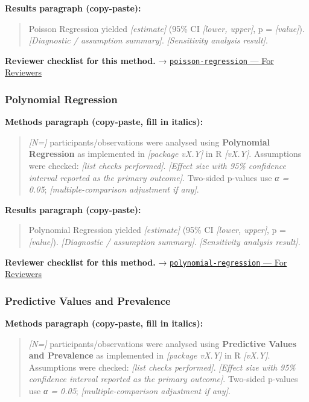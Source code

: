\documentclass[
]{article}
\begin{document}
\textbf{Results paragraph (copy-paste):}

\begin{quote}
Poisson Regression yielded \emph{{[}estimate{]}} (95\% CI
\emph{{[}lower, upper{]}}, p = \emph{{[}value{]}}). \emph{{[}Diagnostic
/ assumption summary{]}}. \emph{{[}Sensitivity analysis result{]}}.
\end{quote}

\textbf{Reviewer checklist for this method.} →
\href{../chapters/07-regression/poisson-regression.Rmd\#for-reviewers}{\texttt{poisson-regression}
--- For Reviewers}

\subsubsection{Polynomial Regression}\label{polynomial-regression}

\textbf{Methods paragraph (copy-paste, fill in italics):}

\begin{quote}
\emph{{[}N={]}} participants/observations were analysed using
\textbf{Polynomial Regression} as implemented in \emph{{[}package
vX.Y{]}} in R \emph{{[}vX.Y{]}}. Assumptions were checked: \emph{{[}list
checks performed{]}}. \emph{{[}Effect size with 95\% confidence interval
reported as the primary outcome{]}}. Two-sided p-values use \emph{α =
0.05}; \emph{{[}multiple-comparison adjustment if any{]}}.
\end{quote}

\textbf{Results paragraph (copy-paste):}

\begin{quote}
Polynomial Regression yielded \emph{{[}estimate{]}} (95\% CI
\emph{{[}lower, upper{]}}, p = \emph{{[}value{]}}). \emph{{[}Diagnostic
/ assumption summary{]}}. \emph{{[}Sensitivity analysis result{]}}.
\end{quote}

\textbf{Reviewer checklist for this method.} →
\href{../chapters/07-regression/polynomial-regression.Rmd\#for-reviewers}{\texttt{polynomial-regression}
--- For Reviewers}

\subsubsection{Predictive Values and
Prevalence}\label{predictive-values-and-prevalence}

\textbf{Methods paragraph (copy-paste, fill in italics):}

\begin{quote}
\emph{{[}N={]}} participants/observations were analysed using
\textbf{Predictive Values and Prevalence} as implemented in
\emph{{[}package vX.Y{]}} in R \emph{{[}vX.Y{]}}. Assumptions were
checked: \emph{{[}list checks performed{]}}. \emph{{[}Effect size with
95\% confidence interval reported as the primary outcome{]}}. Two-sided
p-values use \emph{α = 0.05}; \emph{{[}multiple-comparison adjustment if
any{]}}.
\end{quote}
\end{document}
